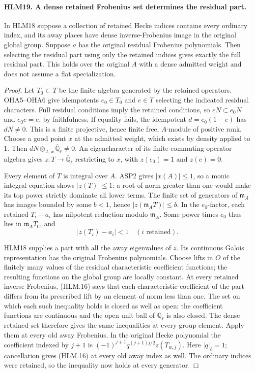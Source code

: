 \paragraph{HLM19. A dense retained Frobenius set determines the residual part.}
\label{claim:HLM19}
In HLM18 suppose a collection of retained Hecke indices
contains every ordinary index, and its away places have
dense inverse-Frobenius image in the original global group.
Suppose \(a\) has the original residual Frobenius
polynomials.  Then selecting the residual part using only
the retained indices gives exactly the full residual part.
This holds over the original \(A\) with a dense admitted
weight and does not assume a flat specialization.
\begin{proof}
Let \(T_0\subset T\) be the finite algebra generated by
the retained operators.  OHA5--OHA6 give idempotents
\(e_0\in T_0\) and \(e\in T\) selecting the indicated
residual characters.  Full residual conditions imply the
retained conditions, so \(eN\subset e_0N\) and
\(e_0e=e\), by faithfulness.  If equality fails, the
idempotent \(d=e_0(1-e)\) has \(dN\ne0\).  This is
a finite projective, hence finite free, \(A\)-module of
positive rank.  Choose a good point \(x\) at the admitted
weight, which exists by density applied to \(1\).
Then \(dN\otimes_{A,x}\overline{\mathbb Q}_\ell\ne0\).
An eigencharacter of its finite commuting operator algebra
gives \(z:T\to\overline{\mathbb Q}_\ell\) restricting
to \(x\), with \(z(e_0)=1\) and \(z(e)=0\).

Every element of \(T\) is integral over \(A\).  ASP2
gives \(|x(A)|\leq1\), so a monic integral equation
shows \(|z(T)|\leq1\): a root of norm greater than one
would make its top power strictly dominate all lower terms.
The finite set of generators of \(\mathfrak m_A\) has
images bounded by some \(b<1\), hence
\(|z(\mathfrak m_AT)|\leq b\).  In the \(e_0\)-factor,
each retained \(T_i-a_i\) has nilpotent reduction modulo
\(\mathfrak m_A\).  Some power times \(e_0\) thus
lies in \(\mathfrak m_AT_0\), and
\[
                 |z(T_i)-a_i|<1
                 \quad(i\text{ retained}).
 \tag{HLM.16}
\]

HLM18 supplies a part with all the away eigenvalues of
\(z\).  Its continuous Galois representation has the
original Frobenius polynomials.  Choose lifts in \(O\)
of the finitely many values of the residual characteristic
coefficient functions; the resulting functions on the
global group are locally constant.  At every retained
inverse Frobenius, (HLM.16) says that each characteristic
coefficient of the part differs from its prescribed lift
by an element of norm less than one.  The set on which
each such inequality holds is closed as well as open:
the coefficient functions are continuous and the open
unit ball of \(\overline{\mathbb Q}_\ell\) is also
closed.  The dense retained set therefore gives the same
inequalities at every group element.  Apply them at every
old away Frobenius.  In the original Hecke polynomial the
coefficient indexed by \(j+1\) is
\((-1)^{j+1}q^{(j+1)j/2}z(T_{w,j})\).
Here \(|q|_\ell=1\); cancellation gives (HLM.16) at
every old away index as well.  The ordinary indices were
retained, so the inequality now holds at every generator.


\end{proof}
